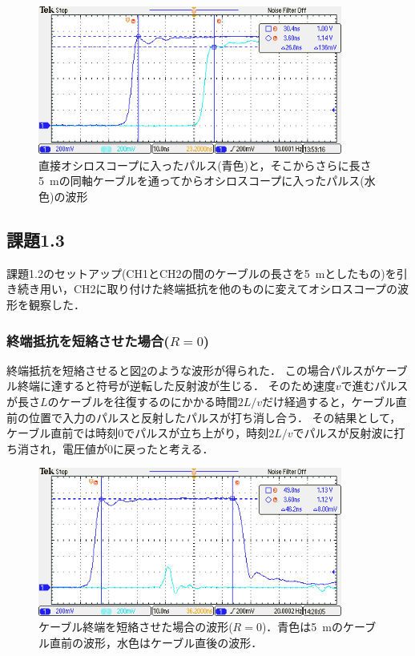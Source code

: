 \documentclass[a4paper,11pt]{jsarticle}
\begin{document}
\begin{figure}[htbp]
  \centering
  \includegraphics[width=10cm]{TEK00728.png}
  \caption{直接オシロスコープに入ったパルス(青色)と，そこからさらに長さ\SI{5}{m}の同軸ケーブルを通ってからオシロスコープに入ったパルス(水色)の波形}
  \label{fig:5m_cable}
\end{figure}

\subsection{課題1.3}
課題1.2のセットアップ(CH1とCH2の間のケーブルの長さを\SI{5}{m}としたもの)を引き続き用い，CH2に取り付けた終端抵抗を他のものに変えてオシロスコープの波形を観察した．

\subsubsection{終端抵抗を短絡させた場合($R=0$)}
終端抵抗を短絡させると図\ref{fig:R=0}のような波形が得られた．
この場合パルスがケーブル終端に達すると符号が逆転した反射波が生じる．
そのため速度$v$で進むパルスが長さ$L$のケーブルを往復するのにかかる時間$2L/v$だけ経過すると，ケーブル直前の位置で入力のパルスと反射したパルスが打ち消し合う．
その結果として，ケーブル直前では時刻0でパルスが立ち上がり，時刻$2L/v$でパルスが反射波に打ち消され，電圧値が0に戻ったと考える．

\begin{figure}[htbp]
  \centering
  \includegraphics[width=10cm]{TEK00729.png}
  \caption{ケーブル終端を短絡させた場合の波形($R=0$)．青色は\SI{5}{m}のケーブル直前の波形，水色はケーブル直後の波形．}
  \label{fig:R=0}
\end{figure}
\end{document}
